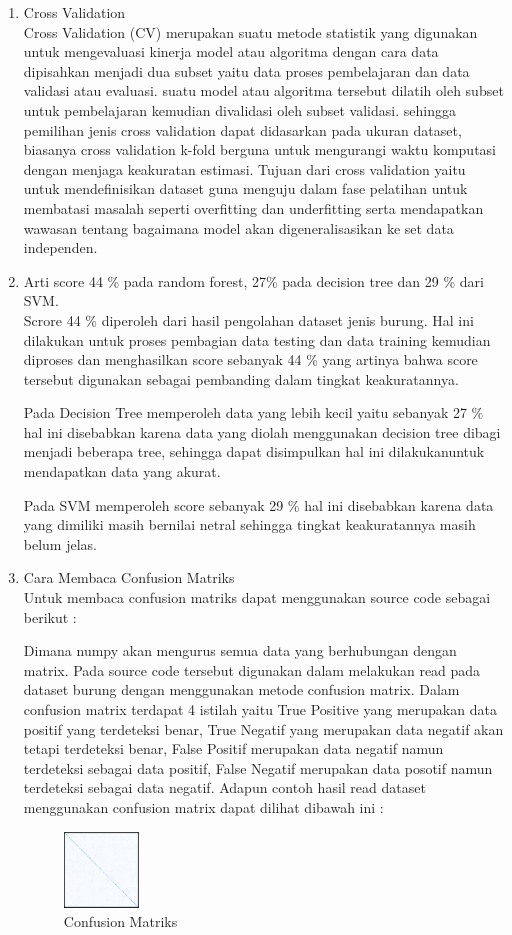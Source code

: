 \begin{enumerate}
\item Cross Validation \\
Cross Validation (CV) merupakan suatu metode statistik yang digunakan untuk mengevaluasi kinerja model atau algoritma dengan cara data dipisahkan menjadi dua subset yaitu data proses pembelajaran dan data validasi atau evaluasi. suatu model atau algoritma tersebut dilatih oleh subset untuk pembelajaran kemudian divalidasi oleh subset validasi. sehingga pemilihan jenis cross validation dapat didasarkan pada ukuran dataset, biasanya cross validation k-fold berguna untuk mengurangi waktu komputasi dengan menjaga keakuratan estimasi. Tujuan dari cross validation yaitu untuk mendefinisikan dataset guna menguju dalam fase pelatihan untuk membatasi masalah seperti overfitting dan underfitting serta mendapatkan wawasan tentang bagaimana model akan digeneralisasikan ke set data independen.

\item Arti score 44 \% pada random forest, 27\% pada decision tree dan 29 \% dari SVM. \\
Scrore 44 \% diperoleh dari hasil pengolahan dataset jenis burung. Hal ini dilakukan untuk proses pembagian data testing dan data training kemudian diproses dan menghasilkan score sebanyak 44 \% yang artinya bahwa score tersebut digunakan sebagai pembanding dalam tingkat keakuratannya.

Pada Decision Tree memperoleh data yang lebih kecil yaitu sebanyak 27 \% hal ini disebabkan karena data yang diolah menggunakan decision tree dibagi menjadi beberapa tree, sehingga dapat disimpulkan hal ini dilakukanuntuk mendapatkan data yang akurat.

Pada SVM memperoleh score sebanyak 29 \% hal ini disebabkan karena data yang dimiliki masih bernilai netral sehingga tingkat keakuratannya masih belum jelas.

\item Cara Membaca Confusion Matriks\\
Untuk membaca confusion matriks dapat menggunakan source code sebagai berikut :

\hfill\break
Dimana numpy akan mengurus semua data yang berhubungan dengan matrix. Pada source code tersebut digunakan dalam melakukan read pada dataset burung dengan menggunakan metode confusion matrix. Dalam confusion matrix terdapat 4 istilah yaitu True Positive yang merupakan data positif yang terdeteksi benar, True Negatif yang merupakan data negatif akan tetapi terdeteksi benar, False Positif merupakan data negatif namun terdeteksi sebagai data positif, False Negatif merupakan data posotif namun terdeteksi sebagai data negatif. Adapun contoh hasil read dataset menggunakan confusion matrix dapat dilihat dibawah ini :
	\begin{figure}[H]
	\centering
		\includegraphics[width=2cm]{figures/1174054/3/2.png}
		\caption{Confusion Matriks}
	\end{figure}


\end{enumerate}
